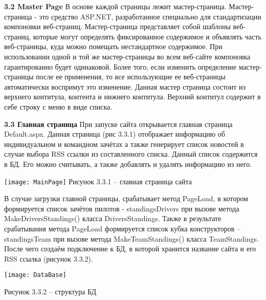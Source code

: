 \documentclass[14pt,a4paper]{extreport}
\begin{document}
	\flushleft\hspace{4ex}\textbf{3.2 Master Page}
\flushleft\hspace{4ex}В основе каждой страницы лежит мастер-страница. Мастер-страница - это средство ASP.NET, разработанное специально для стандартизации компоновки веб-страниц. Мастер-страница представляет собой шаблоны веб-страниц, которые могут определять фиксированное содержимое и объявлять часть веб-страницы, куда можно помещать нестандартное содержимое. При использовании одной и той же мастер-страницы во всем веб-сайте компоновка гарантированно будет одинаковой. Более того, если изменить определение мастер-страницы после ее применения, то все использующие ее веб-страницы автоматически воспримут это изменение.
	Данная мастер страница состоит из верхнего контитула, контента и нижнего контитула. Верхний контитул содержит в себе строку с меню в виде списка.\par

	
	\flushleft\hspace{4ex}\textbf{3.3 Главная страница}
\flushleft\hspace{4ex}При запуске сайта открывается главная страница Default.aspx. Данная страница (рис 3.3.1) отображает информацию об индивидуальном и командном зачётах а также генерирует список новостей в случае выбора RSS ссылки из составленного списка. Данный список содержится в БД. Его можно считывать, а также добавлять и удалять информацию из него.\par
	\texttt{[image: MainPage]}   
           \center Рисунок 3.3.1 – главная страница сайта\par
           
\flushleft\hspace{4ex} В случае загрузки главной страницы, срабатывает метод PageLoad, в котором формируется список зачётов пилотов - standingsDrivers при вызове метода MakeDriversStandings() класса DriversStandings. Также в результате срабатывания метода PageLoad формируется список кубка конструкторов – standingsTeam при вызове метода MakeTeamStandings() класса TeamStandings. После чего создаём подключение к БД, в которой хранится название сайта и его RSS ссылка (рисунок 3.3.2).\par
	\center\texttt{[image: DataBase]}\par
           \center Рисунок 3.3.2 – структура БД \par
           
\end{document}
